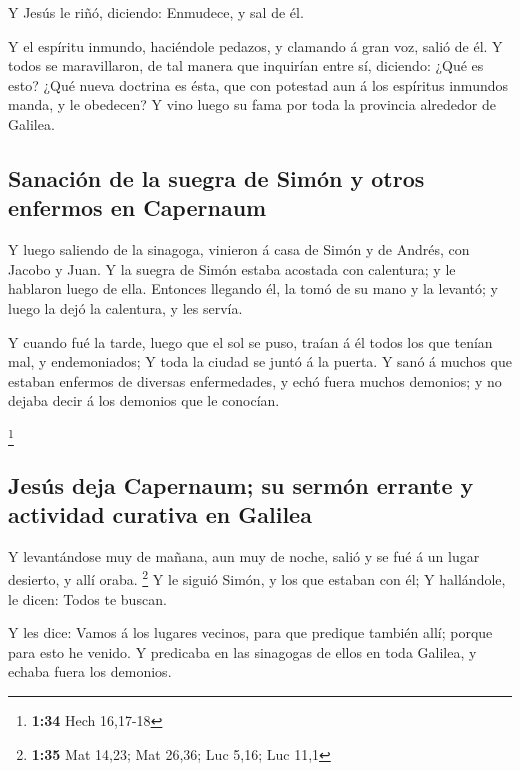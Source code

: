  Y Jesús le riñó, diciendo: Enmudece, y sal de él.

 Y el espíritu inmundo, haciéndole pedazos, y clamando á
gran voz, salió de él.  Y todos se maravillaron, de tal
manera que inquirían entre sí, diciendo: ¿Qué es esto? ¿Qué nueva
doctrina es ésta, que con potestad aun á los espíritus inmundos manda, y
le obedecen?  Y vino luego su fama por toda la provincia
alrededor de Galilea.

\hypertarget{sanaciuxf3n-de-la-suegra-de-simuxf3n-y-otros-enfermos-en-capernaum}{%
\subsection{Sanación de la suegra de Simón y otros enfermos en
Capernaum}\label{sanaciuxf3n-de-la-suegra-de-simuxf3n-y-otros-enfermos-en-capernaum}}

 Y luego saliendo de la sinagoga, vinieron á casa de Simón
y de Andrés, con Jacobo y Juan.  Y la suegra de Simón
estaba acostada con calentura; y le hablaron luego de ella.
 Entonces llegando él, la tomó de su mano y la levantó; y
luego la dejó la calentura, y les servía.

 Y cuando fué la tarde, luego que el sol se puso, traían á
él todos los que tenían mal, y endemoniados;  Y toda la
ciudad se juntó á la puerta.  Y sanó á muchos que estaban
enfermos de diversas enfermedades, y echó fuera muchos demonios; y no
dejaba decir á los demonios que le conocían.

\footnote{\textbf{1:34} Hech 16,17-18}

\hypertarget{jesuxfas-deja-capernaum-su-sermuxf3n-errante-y-actividad-curativa-en-galilea}{%
\subsection{Jesús deja Capernaum; su sermón errante y actividad curativa
en
Galilea}\label{jesuxfas-deja-capernaum-su-sermuxf3n-errante-y-actividad-curativa-en-galilea}}

 Y levantándose muy de mañana, aun muy de noche, salió y se
fué á un lugar desierto, y allí oraba. \footnote{\textbf{1:35} Mat
  14,23; Mat 26,36; Luc 5,16; Luc 11,1}  Y le siguió Simón,
y los que estaban con él;  Y hallándole, le dicen: Todos te
buscan.

 Y les dice: Vamos á los lugares vecinos, para que predique
también allí; porque para esto he venido.  Y predicaba en
las sinagogas de ellos en toda Galilea, y echaba fuera los demonios.

